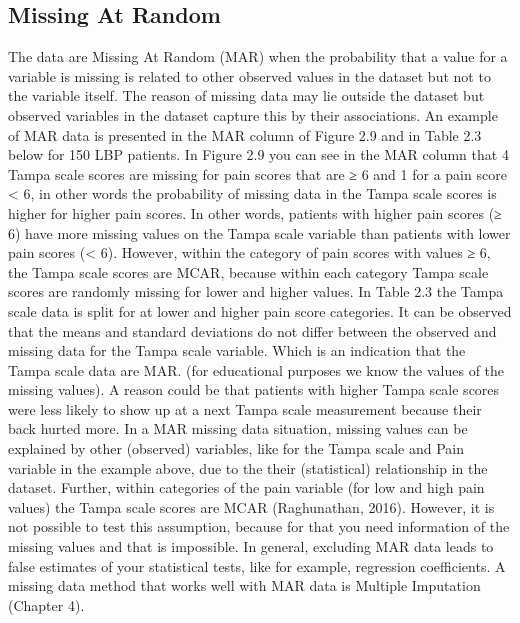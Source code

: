 \documentclass[]{book}
\begin{document}
\subsection{Missing At Random}\label{missing-at-random}

The data are Missing At Random (MAR) when the probability that a value
for a variable is missing is related to other observed values in the
dataset but not to the variable itself. The reason of missing data may
lie outside the dataset but observed variables in the dataset capture
this by their associations. An example of MAR data is presented in the
MAR column of Figure 2.9 and in Table 2.3 below for 150 LBP patients. In
Figure 2.9 you can see in the MAR column that 4 Tampa scale scores are
missing for pain scores that are ≥ 6 and 1 for a pain score \textless{}
6, in other words the probability of missing data in the Tampa scale
scores is higher for higher pain scores. In other words, patients with
higher pain scores (≥ 6) have more missing values on the Tampa scale
variable than patients with lower pain scores (\textless{} 6). However,
within the category of pain scores with values ≥ 6, the Tampa scale
scores are MCAR, because within each category Tampa scale scores are
randomly missing for lower and higher values. In Table 2.3 the Tampa
scale data is split for at lower and higher pain score categories. It
can be observed that the means and standard deviations do not differ
between the observed and missing data for the Tampa scale variable.
Which is an indication that the Tampa scale data are MAR. (for
educational purposes we know the values of the missing values). A reason
could be that patients with higher Tampa scale scores were less likely
to show up at a next Tampa scale measurement because their back hurted
more. In a MAR missing data situation, missing values can be explained
by other (observed) variables, like for the Tampa scale and Pain
variable in the example above, due to the their (statistical)
relationship in the dataset. Further, within categories of the pain
variable (for low and high pain values) the Tampa scale scores are MCAR
(Raghunathan, 2016). However, it is not possible to test this
assumption, because for that you need information of the missing values
and that is impossible. In general, excluding MAR data leads to false
estimates of your statistical tests, like for example, regression
coefficients. A missing data method that works well with MAR data is
Multiple Imputation (Chapter 4).
\end{document}
